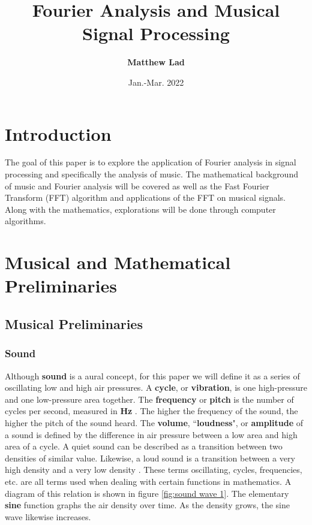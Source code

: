 \documentclass[10pt]{article}
\title{
    \textbf{Fourier Analysis and Musical Signal Processing}}
\author{\textbf{Matthew Lad}}
\date{Jan.-Mar. 2022}
\begin{document}
 
\maketitle

\section{Introduction}
\hspace{\parindent} The goal of this paper is to explore the application of Fourier analysis in signal processing and specifically the analysis of music. The mathematical background of music and Fourier analysis will be covered as well as the Fast Fourier Transform (FFT) algorithm and applications of the FFT on musical signals. Along with the mathematics, explorations will be done through computer algorithms.

\section{Musical and Mathematical Preliminaries}

\subsection{Musical Preliminaries}
\subsubsection{Sound}
\hspace{\parindent}Although \textbf{sound} is a aural concept, for this paper we will define it as a series of oscillating low and high air pressures. A \textbf{cycle}, or \textbf{vibration}, is one high-pressure and one low-pressure area together. The \textbf{frequency} or \textbf{pitch} is the number of cycles per second, measured in \textbf{Hz} \cite{hertzDefinition}. The higher the frequency of the sound, the higher the pitch of the sound heard. The \textbf{volume}, \textquotedblleft\textbf{loudness}", or \textbf{amplitude} of a sound is defined by the difference in air pressure between a low area and high area of a cycle. A quiet sound can be described as a transition between two densities of similar value. Likewise, a loud sound is a transition between a very high density and a very low density \cite{boatwright1956musictheory} \cite{lenssen2014fouriermusic}. These terms oscillating, cycles, frequencies, etc. are all terms used when dealing with certain functions in mathematics. A diagram of this relation is shown in figure \ref{fig:sound wave 1}. The elementary \textbf{sine} function graphs the air density over time. As the density grows, the sine wave likewise increases.
\end{document}
